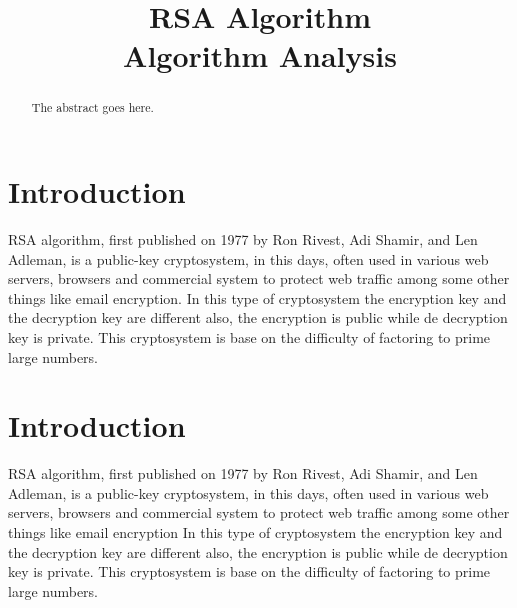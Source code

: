 \documentclass[conference,compsoc, 10pt]{IEEEtran}
\begin{document}
	

\title{RSA Algorithm\\ Algorithm Analysis}
\author{
\and
{}
\and
{}
}

\maketitle
\large
\begin{abstract}
	\large
	The abstract goes here.
\end{abstract}

\IEEEpeerreviewmaketitle


\section{Introduction}
RSA algorithm, first published on 1977 by Ron Rivest, Adi Shamir, and Len Adleman,  is a public-key cryptosystem, in this days, often used in various web servers, browsers and commercial system to protect web traffic among some other things like email encryption. In this type of cryptosystem the encryption key and the decryption key are different also, the encryption is public while de decryption key is private. This cryptosystem is base on the difficulty of factoring to prime large numbers.

\section[12pt]{Introduction}

RSA algorithm, first published on 1977 by Ron Rivest, Adi Shamir, and Len Adleman,  is a public-key cryptosystem, in this days, often used in various web servers, browsers and commercial system to protect web traffic among some other things like email encryption In this type of cryptosystem the encryption key and the decryption key are different also, the encryption is public while de decryption key is private. This cryptosystem is base on the difficulty of factoring to prime large numbers.
\end{document}
